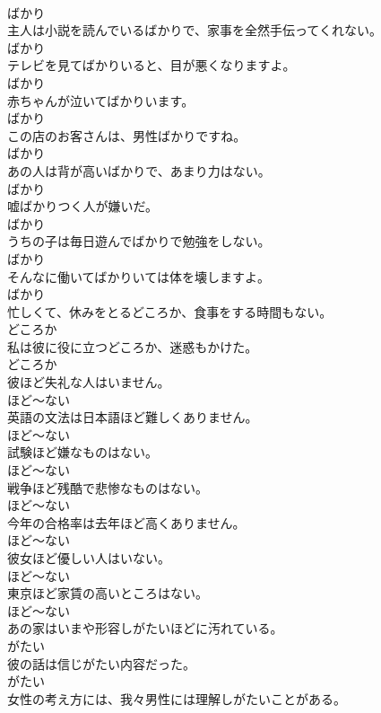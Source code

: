 \documentclass[8pt]{extreport}
\begin{document}
\begin{CJK}{UTF8}{min}
\\	ばかり
\\	主人は小説を読んでいるばかりで、家事を全然手伝ってくれない。	
\\	ばかり
\\	テレビを見てばかりいると、目が悪くなりますよ。	
\\	ばかり
\\	赤ちゃんが泣いてばかりいます。	
\\	ばかり
\\	この店のお客さんは、男性ばかりですね。	
\\	ばかり
\\	あの人は背が高いばかりで、あまり力はない。	
\\	ばかり
\\	嘘ばかりつく人が嫌いだ。	
\\	ばかり
\\	うちの子は毎日遊んでばかりで勉強をしない。	
\\	ばかり
\\	そんなに働いてばかりいては体を壊しますよ。	
\\	ばかり
\\	忙しくて、休みをとるどころか、食事をする時間もない。	
\\	どころか
\\	私は彼に役に立つどころか、迷惑もかけた。	
\\	どころか
\\	彼ほど失礼な人はいません。	
\\	ほど～ない
\\	英語の文法は日本語ほど難しくありません。	
\\	ほど～ない
\\	試験ほど嫌なものはない。	
\\	ほど～ない
\\	戦争ほど残酷で悲惨なものはない。	
\\	ほど～ない
\\	今年の合格率は去年ほど高くありません。	
\\	ほど～ない
\\	彼女ほど優しい人はいない。	
\\	ほど～ない
\\	東京ほど家賃の高いところはない。	
\\	ほど～ない
\\	あの家はいまや形容しがたいほどに汚れている。	
\\	がたい
\\	彼の話は信じがたい内容だった。	
\\	がたい
\\	女性の考え方には、我々男性には理解しがたいことがある。	

\end{CJK}
\end{document}
